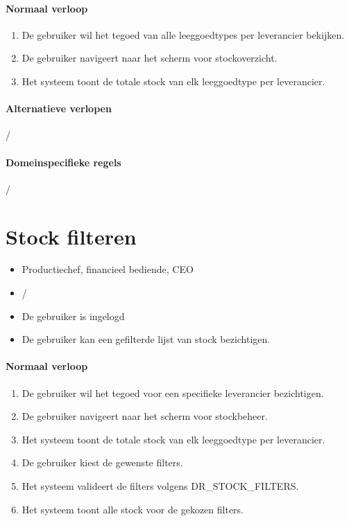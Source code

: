     \paragraph{Normaal verloop}
    \begin{enumerate}[nosep]
        \item De gebruiker wil het tegoed van alle leeggoedtypes per leverancier bekijken.
        \item De gebruiker navigeert naar het scherm voor stockoverzicht.
        \item Het systeem toont de totale stock van elk leeggoedtype per leverancier.
    \end{enumerate}

    \paragraph{Alternatieve verlopen}
    /

    \paragraph{Domeinspecifieke regels}
    /

    \vspace{1cm}
\pagebreak
\section{Stock filteren}
\label{uc:stock-filteren}

    \vspace{0.5em}

    \begin{itemize}[leftmargin=3.5cm, labelsep=0.5cm, nosep]
        \item[\textbf{Primaire actor:}] Productiechef, financieel bediende, CEO
        \item[\textbf{Stakeholders:}] /
        \item[\textbf{Precondities:}] De gebruiker is ingelogd
        \item[\textbf{Postcondities:}] De gebruiker kan een gefilterde lijst van stock bezichtigen.
    \end{itemize}

    \paragraph{Normaal verloop}
    \begin{enumerate}[nosep]
        \item De gebruiker wil het tegoed voor een specifieke leverancier bezichtigen.
        \item De gebruiker navigeert naar het scherm voor stockbeheer.
        \item Het systeem toont de totale stock van elk leeggoedtype per leverancier.
        \item De gebruiker kiest de gewenste filters.
        \item Het systeem valideert de filters volgens DR\_STOCK\_FILTERS.
        \item Het systeem toont alle stock voor de gekozen filters.
    \end{enumerate}


